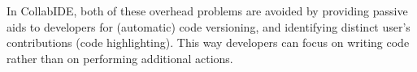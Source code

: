 In CollabIDE, both of these overhead problems are avoided by providing passive aids to developers for 
(automatic) code versioning, and identifying distinct user’s contributions (code highlighting). This way 
developers can focus on writing code rather than on performing additional actions.


\endinput

